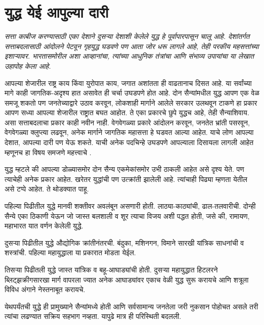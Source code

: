 \chapter{युद्ध येई आपुल्या दारी}

{\textit{सत्ता काबीज करण्यासाठी एका देशाने दुसऱ्या देशाशी केलेले युद्ध हे पूर्वापारपासून चालू आहे. देशांतर्गत सत्ताबदलासाठी आंदोलने पेटवून गृहयुद्ध घडवणे पण आता जोर धरू लागले आहे, तेही परकीय महसत्तांच्या इशाऱ्यावर. भारतासमोरील अशा आव्हानांचा, त्यांच्या आधुनिक तंत्रांचा आणि संभाव्य उपायांचा या लेखात उहापोह केला आहे.}}

\vspace{1.5em}

आपल्या शेजारील राष्ट्र काय किंवा युरोपात काय, जगात अशांतता ही वाढतानाच दिसत आहे. या सर्वांच्या मागे काही जागतिक-अदृश्य हात असावेत ही चर्चा उघडपणे होत आहे. दोन सैन्यांमधील युद्ध आपण एक वेळ समजू शकतो पण जनतेच्याद्वारे उठाव करवून, लोकशाही मार्गाने आलेले सरकार उलथवून टाकणे हा प्रकार आपण सध्या आपल्या शेजारील राष्ट्रात बघत आहोत. ते एका प्रकारचे छुपे युद्धच आहे, तेही सैन्याशिवाय. असा सत्ताबदलाचा प्रकार काही नवीन नाही. वेगवेगळ्या प्रकारे आंदोलन करवून, जनतेत भ्रांती पसरवून, वेगवेगळ्या क्लुप्त्या लढवून, अनेक मार्गाने जागतिक महासत्ता हे घडवत आल्या आहेत. याचे लोण आपल्या देशात, आपल्या दारी पण येऊ शकते. याची अनेक पदचिन्हे उघडपणे आपल्याला दिसायला लागली आहेत म्हणूनच हा विषय समजणे महत्त्वाचे .

युद्ध म्हटले की आपल्या डोळ्यासमोर दोन सैन्य एकमेकांसमोर उभी ठाकली आहेत असे दृश्य येते. पण त्याचेही अनेक प्रकार आहेत. खरेतर युद्धांची पण उत्क्रांती झालेली आहे. त्यांचाही पिढ्या म्हणता येतील असे टप्पे आहेत. ते थोडक्यात पाहू.

पहिल्या पिढीतील युद्धे मानवी शक्तीवर अवलंबून असणारी होती. लाठ्या-काठ्यांची, ढाल-तलवारीची. दोन्ही सैन्ये एका ठिकाणी येऊन जो जास्त बलशाली व शूर त्याचा विजय अशी पद्धत होती, जसे की, रामायण, महाभारत यात वर्णन केलेली युद्धे.

दुसऱ्या पिढीतील युद्धे औद्योगिक क्रांतीनंतरची. बंदुका, मशिनगन, विमाने सारखी यांत्रिक साधनांची व शस्त्रांची. पहिल्या महायुद्धाला या प्रकारात मोडता येईल.

तिसऱ्या पिढीतली युद्धे जास्त यांत्रिक व बहू-आघाड्यांची होती. दुसऱ्या महायुद्धात हिटलरने ब्लिट्झक्रीगसारखा मार्ग वापरला ज्यात अनेक आघाड्यांवर एकाच वेळी युद्ध सुरू करायचे आणि शत्रूला विविध अंगाने नेस्तनाबूत करायचे.

येथपर्यंतची युद्धे ही प्रामुख्याने सैन्यांमध्ये होती आणि सर्वसामान्य जनतेला जरी नुकसान पोहोचत असले तरी त्यांचा लढण्यात सक्रिय सहभाग नव्हता. यापुढे मात्र ही परिस्थिती बदलली.

